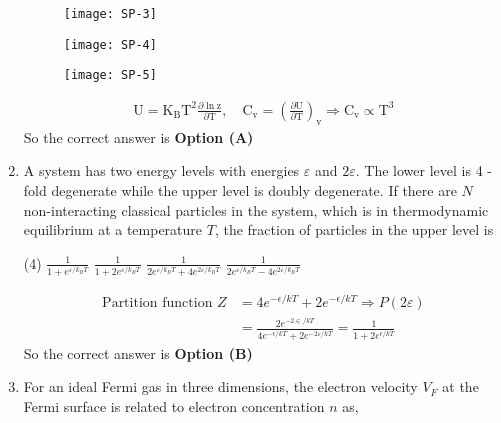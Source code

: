 \begin{enumerate}
\begin{tasks}
\task[\textbf{B.}] \begin{figure}[H]
	\centering
	\texttt{[image: SP-3]}
\end{figure}
\task[\textbf{C.}] \begin{figure}[H]
	\centering
	\texttt{[image: SP-4]}
\end{figure}
\task[\textbf{D.}] \begin{figure}[H]
	\centering
	\texttt{[image: SP-5]}
\end{figure}
\end{tasks}
\begin{answer}
\begin{align*}
\mathrm{U}=\mathrm{K}_{\mathrm{B}} \mathrm{T}^{2} \frac{\partial \ln \mathrm{z}}{\partial \mathrm{T}}, \quad \mathrm{C}_{\mathrm{v}}=\left(\frac{\partial \mathrm{U}}{\partial \mathrm{T}}\right)_{\mathrm{v}} \Rightarrow \mathrm{C}_{\mathrm{v}} \propto \mathrm{T}^{3}
\end{align*}
So the correct answer is \textbf{Option (A)}
\end{answer}
\item 	A system has two energy levels with energies $\varepsilon$ and $2 \varepsilon .$ The lower level is 4 -fold degenerate while the upper level is doubly degenerate. If there are $N$ non-interacting classical particles in the system, which is in thermodynamic equilibrium at a temperature $T$, the fraction of particles in the upper level is
{}
\begin{tasks}(4)
\task[\textbf{A.}] $\frac{1}{1+e^{\varepsilon / k_{B} T}}$
\task[\textbf{B.}] $\frac{1}{1+2 e^{\varepsilon / k_{B} T}}$
\task[\textbf{C.}] $\frac{1}{2 e^{\varepsilon / k_{B} T}+4 e^{2 \varepsilon / k_{B} T}}$
\task[\textbf{D.}] $\frac{1}{2 e^{\varepsilon / k_{B} T}-4 e^{2 \varepsilon / k_{B} T}}$
\end{tasks}
\begin{answer}
\begin{align*}
\text{Partition function }Z&=4 e^{-\epsilon / k T}+2 e^{-\epsilon / k T} \Rightarrow P(2 \varepsilon)\\&=\frac{2 e^{-2 \in / k T}}{4 e^{-\epsilon / k T}+2 e^{-2 \varepsilon / k T}}=\frac{1}{1+2 e^{\epsilon / k T}}
\end{align*}
So the correct answer is \textbf{Option (B)}
\end{answer}
\item 	For an ideal Fermi gas in three dimensions, the electron velocity $V_{F}$ at the Fermi surface is related to electron concentration $n$ as,

\end{enumerate}
